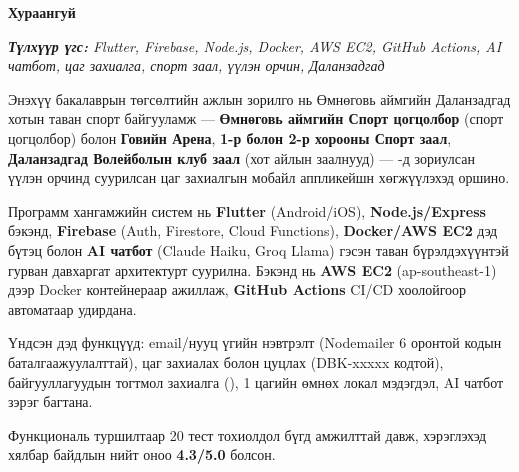 

\begin{center}
{\scshape\Large \univname\par} %
{\scshape\large \facname\par}\vspace{0.5cm}
{\huge\textbf{{Хураангуй}} \par}
\bigskip
{\Large{\ttitle} \par} %
\bigskip

{\normalsize \shortname \par} %
\mailaddress
\end{center}

\bigskip

\textit{\textbf{Түлхүүр үгс:} Flutter, Firebase, Node.js, Docker, AWS EC2, GitHub Actions, AI чатбот, цаг захиалга, спорт заал, үүлэн орчин, Даланзадгад}

\bigskip

Энэхүү бакалаврын төгсөлтийн ажлын зорилго нь Өмнөговь аймгийн Даланзадгад хотын таван спорт байгууламж --- \textbf{Өмнөговь аймгийн Спорт цогцолбор} (спорт цогцолбор) болон \textbf{Говийн Арена}, \textbf{1-р болон 2-р хорооны Спорт заал}, \textbf{Даланзадгад Волейболын клуб заал} (хот айлын заалнууд) --- -д зориулсан үүлэн орчинд суурилсан цаг захиалгын мобайл аппликейшн хөгжүүлэхэд оршино.

Программ хангамжийн систем нь \textbf{Flutter} (Android/iOS), \textbf{Node.js/Express} бэкэнд, \textbf{Firebase} (Auth, Firestore, Cloud Functions), \textbf{Docker/AWS EC2} дэд бүтэц болон \textbf{AI чатбот} (Claude Haiku, Groq Llama) гэсэн таван бүрэлдэхүүнтэй гурван давхаргат архитектурт суурилна. Бэкэнд нь \textbf{AWS EC2} (ap-southeast-1) дээр Docker контейнераар ажиллаж, \textbf{GitHub Actions} CI/CD хоолойгоор автоматаар удирдана.

Үндсэн дэд функцүүд: email/нууц үгийн нэвтрэлт (Nodemailer 6 оронтой кодын баталгаажуулалттай), цаг захиалах болон цуцлах (DBK-xxxxx кодтой), байгууллагуудын тогтмол захиалга (), 1 цагийн өмнөх локал мэдэгдэл, AI чатбот зэрэг багтана.

Функциональ туршилтаар 20 тест тохиолдол бүгд амжилттай давж, хэрэглэхэд хялбар байдлын нийт оноо \textbf{4.3/5.0} болсон.

